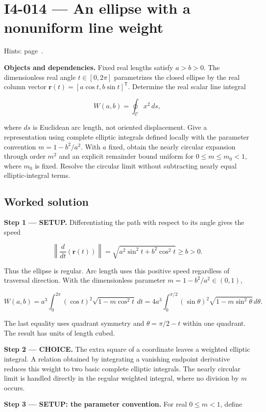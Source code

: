 \documentclass[11pt,oneside,openany]{book}
\begin{document}
\section{I4-014 --- An ellipse with a nonuniform line weight}
\label{problem:I4-014}
{\small Hints: page~\pageref{hints:I4-014}.}\par\medskip

\textbf{Objects and dependencies.} Fixed real lengths satisfy \(a>b>0\). The dimensionless real angle \(t\in[0,2\pi]\) parametrizes the closed ellipse by the real column vector \(\mathbf r(t)=[a\cos t,b\sin t]^{\mathsf T}\). Determine the real scalar line integral

\[
W(a,b)=\oint_{\mathcal C}x^2\,ds,
\]

where \(ds\) is Euclidean arc length, not oriented displacement. Give a representation using complete elliptic integrals defined locally with the parameter convention \(m=1-b^2/a^2\). With \(a\) fixed, obtain the nearly circular expansion through order \(m^2\) and an explicit remainder bound uniform for \(0\le m\le m_0<1\), where \(m_0\) is fixed. Resolve the circular limit without subtracting nearly equal elliptic-integral terms.
\subsection*{Worked solution}

\textbf{Step 1 --- SETUP.} Differentiating the path with respect to its angle gives the speed

\[
\left\|\frac{d}{dt}\left(\mathbf r(t)\right)\right\|
=\sqrt{a^2\sin^2t+b^2\cos^2t}\ge b>0.
\]

Thus the ellipse is regular. Arc length uses this positive speed regardless of traversal direction. With the dimensionless parameter \(m=1-b^2/a^2\in(0,1)\),

\[
W(a,b)=a^3\int_0^{2\pi}(\cos t)^2\sqrt{1-m\cos^2t}\,dt
=4a^3\int_0^{\pi/2}(\sin\theta)^2\sqrt{1-m\sin^2\theta}\,d\theta.
\]

The last equality uses quadrant symmetry and \(\theta=\pi/2-t\) within one quadrant. The result has units of length cubed.

\begin{ChoiceStep}
\textbf{Step 2 --- CHOICE.} The extra square of a coordinate leaves a weighted elliptic integral. A relation obtained by integrating a vanishing endpoint derivative reduces this weight to two basic complete elliptic integrals. The nearly circular limit is handled directly in the regular weighted integral, where no division by \(m\) occurs.

\end{ChoiceStep}
\textbf{Step 3 --- SETUP: the parameter convention.} For real \(0\le m<1\), define
\end{document}
